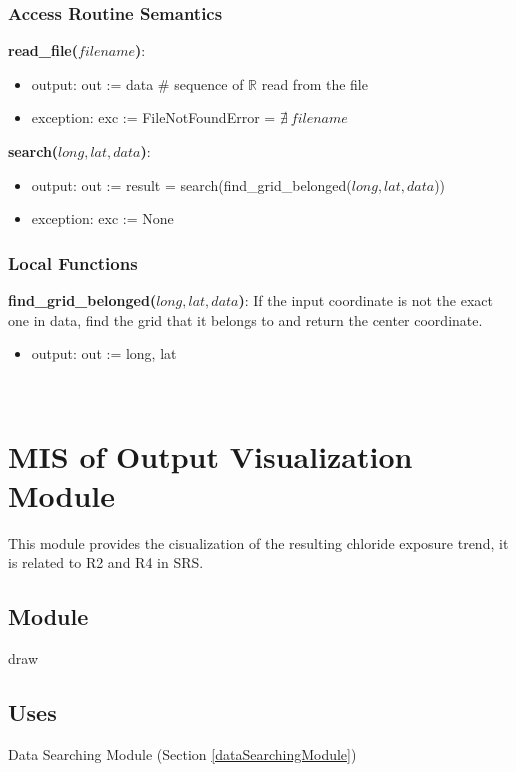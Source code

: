 \documentclass[12pt, titlepage]{article}
\begin{document}
\subsubsection{Access Routine Semantics}
\noindent \textbf{read\_file($filename$)}:
\begin{itemize}
\item output: out := data \# sequence of $\mathbb{R}$ read from the file
\item exception: exc := FileNotFoundError = $\nexists ~ filename$
\end{itemize}
\noindent \textbf{search($long, lat, data$)}:
\begin{itemize}
\item output: out := result = search(find\_grid\_belonged($long, lat, data$))
\item exception: exc := None
\end{itemize}

\subsubsection{Local Functions}
\noindent \textbf{find\_grid\_belonged($long, lat, data$)}: If the input coordinate is not the exact one in data, find the grid that it belongs to and return the center coordinate.
\begin{itemize}
\item output: out := long, lat

\end{itemize}


~\newpage

\section{MIS of Output Visualization Module} \label{outputVisualizationModule}
This module provides the cisualization of the resulting chloride exposure trend, it is related to R2 and R4 in SRS.

\subsection{Module}

draw

\subsection{Uses}

Data Searching Module (Section \ref{dataSearchingModule})
\end{document}
